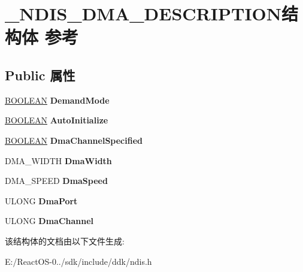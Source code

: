 \hypertarget{struct___n_d_i_s___d_m_a___d_e_s_c_r_i_p_t_i_o_n}{}\section{\+\_\+\+N\+D\+I\+S\+\_\+\+D\+M\+A\+\_\+\+D\+E\+S\+C\+R\+I\+P\+T\+I\+O\+N结构体 参考}
\label{struct___n_d_i_s___d_m_a___d_e_s_c_r_i_p_t_i_o_n}
\subsection*{Public 属性}
\begin{DoxyCompactItemize}
\item 
\mbox{\label{struct___n_d_i_s___d_m_a___d_e_s_c_r_i_p_t_i_o_n_a14da5f2173e80b1c642cf91bbca795fb}} 
\hyperlink{_processor_bind_8h_a112e3146cb38b6ee95e64d85842e380a}{B\+O\+O\+L\+E\+AN} {\bfseries Demand\+Mode}
\item 
\mbox{\label{struct___n_d_i_s___d_m_a___d_e_s_c_r_i_p_t_i_o_n_a2c6e4d57ef5c72469f355df7e4dbfff9}} 
\hyperlink{_processor_bind_8h_a112e3146cb38b6ee95e64d85842e380a}{B\+O\+O\+L\+E\+AN} {\bfseries Auto\+Initialize}
\item 
\mbox{\label{struct___n_d_i_s___d_m_a___d_e_s_c_r_i_p_t_i_o_n_a771862a562c3ad609cba9bc0d5dcb6bd}} 
\hyperlink{_processor_bind_8h_a112e3146cb38b6ee95e64d85842e380a}{B\+O\+O\+L\+E\+AN} {\bfseries Dma\+Channel\+Specified}
\item 
\mbox{\label{struct___n_d_i_s___d_m_a___d_e_s_c_r_i_p_t_i_o_n_a105dc49aded5b0f4a82d5c09311e96d1}} 
D\+M\+A\+\_\+\+W\+I\+D\+TH {\bfseries Dma\+Width}
\item 
\mbox{\label{struct___n_d_i_s___d_m_a___d_e_s_c_r_i_p_t_i_o_n_a9d620845494211de1037c808df515563}} 
D\+M\+A\+\_\+\+S\+P\+E\+ED {\bfseries Dma\+Speed}
\item 
\mbox{\label{struct___n_d_i_s___d_m_a___d_e_s_c_r_i_p_t_i_o_n_a8de4a9b6d177e8e76fbc6a686275983a}} 
U\+L\+O\+NG {\bfseries Dma\+Port}
\item 
\mbox{\label{struct___n_d_i_s___d_m_a___d_e_s_c_r_i_p_t_i_o_n_adbf716cab8494e02a1fcb369165b2e51}} 
U\+L\+O\+NG {\bfseries Dma\+Channel}
\end{DoxyCompactItemize}


该结构体的文档由以下文件生成\+:\begin{DoxyCompactItemize}
\item 
E\+:/\+React\+O\+S-\/0../sdk/include/ddk/ndis.\+h\end{DoxyCompactItemize}
